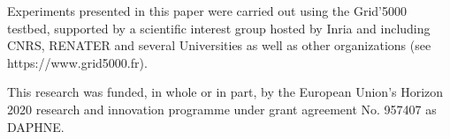 \documentclass[sigconf,natbib=false]{acmart}
\begin{document}

Experiments presented in this paper were carried out using the Grid'5000 testbed, supported by a scientific interest group hosted by Inria and including CNRS, RENATER and several Universities as well as other organizations (see https://www.grid5000.fr). 

This research was funded, in whole or in part, by the European Union’s Horizon 2020 research and innovation programme under grant agreement No. 957407 as DAPHNE.


\newpage
\newpage
%
%
\printbibliography
\end{document}
